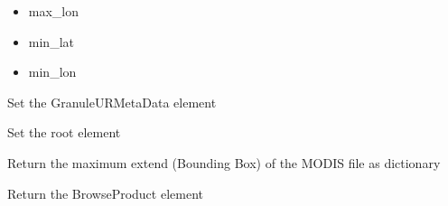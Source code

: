 \documentclass[a4paper,11pt,oneside]{sphinxmanual}
\begin{document}
\begin{fulllineitems}
\begin{fulllineitems}
\begin{description}
\begin{itemize}
\item {} 
max\_lon

\item {} 
min\_lat

\item {} 
min\_lon

\end{itemize}

\end{description}

\end{fulllineitems}


\begin{fulllineitems}
\label{pymodis/pymodis:pymodis.parsemodis.parseModis.getGranule}
Set the GranuleURMetaData element

\end{fulllineitems}


\begin{fulllineitems}
\label{pymodis/pymodis:pymodis.parsemodis.parseModis.getRoot}
Set the root element

\end{fulllineitems}


\begin{fulllineitems}
\label{pymodis/pymodis:pymodis.parsemodis.parseModis.retBoundary}
Return the maximum extend (Bounding Box) of the MODIS file as
dictionary

\end{fulllineitems}


\begin{fulllineitems}
\label{pymodis/pymodis:pymodis.parsemodis.parseModis.retBrowseProduct}
Return the BrowseProduct element

\end{fulllineitems}



\end{fulllineitems}
\end{document}
